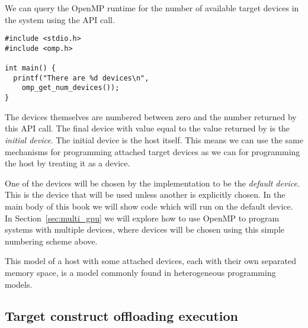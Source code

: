 We can query the OpenMP runtime for the number of available target devices in the system using the  API call.

\begin{verbatim}
#include <stdio.h>
#include <omp.h>

int main() {
  printf("There are %d devices\n",
    omp_get_num_devices());
}
\end{verbatim}

The devices themselves are numbered between zero and the number returned by this API call.
The final device with value equal to the value returned by  is the \emph{initial device}.
The initial device is the host itself.
This means we can use the same mechanisms for programming attached target devices as we can for programming the host by treating it as a device.

One of the devices will be chosen by the implementation to be the \emph{default device}.
This is the device that will be used unless another is explicitly chosen.
In the main body of this book we will show code which will run on the default device.
In Section~\ref{sec:multi_gpu} we will explore how to use OpenMP to program systems with multiple devices, where devices will be chosen using this simple numbering scheme above.

This model of a host with some attached devices, each with their own separated memory space, is a model commonly found in heterogeneous programming models.

\subsection{Target construct offloading execution}


